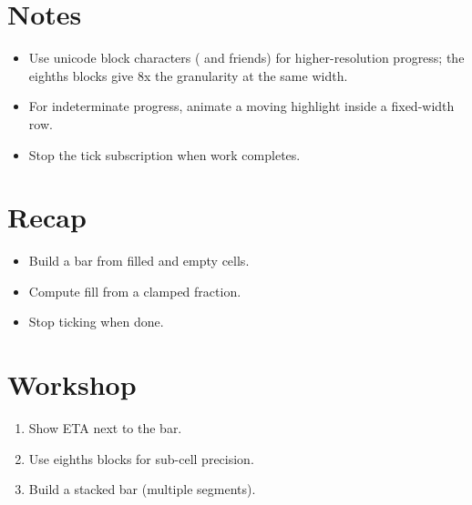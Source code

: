 \section{Notes}

\begin{itemize}[leftmargin=*]
  \item Use unicode block characters ( and
    friends) for higher-resolution progress; the eighths
    blocks give 8x the granularity at the same width.
  \item For indeterminate progress, animate a moving
    highlight inside a fixed-width row.
  \item Stop the tick subscription when work completes.
\end{itemize}

\section{Recap}

\begin{recap}
\begin{itemize}[leftmargin=*]
  \item Build a bar from filled and empty cells.
  \item Compute fill from a clamped fraction.
  \item Stop ticking when done.
\end{itemize}
\end{recap}

\section*{Workshop}

\begin{enumerate}[leftmargin=*]
  \item Show ETA next to the bar.
  \item Use eighths blocks for sub-cell precision.
  \item Build a stacked bar (multiple segments).
\end{enumerate}
